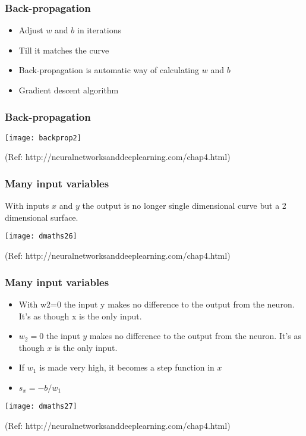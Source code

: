 \begin{frame}[fragile] \frametitle{Back-propagation}
\begin{itemize}
\item Adjust $w$ and $b$ in iterations
\item Till it matches the curve
\item Back-propagation is automatic way of calculating $w$ and $b$
\item Gradient descent algorithm
\end{itemize}
\end{frame}

\begin{frame}[fragile] \frametitle{Back-propagation}
\begin{center}
\texttt{[image: backprop2]}
\end{center}
{\tiny (Ref: http://neuralnetworksanddeeplearning.com/chap4.html)}
\end{frame}



\begin{frame}[fragile] \frametitle{Many input variables}
With inputs $x$ and $y$ the output is no longer single dimensional curve but a 2 dimensional surface.

\begin{center}
\texttt{[image: dmaths26]}
\end{center}
{\tiny (Ref: http://neuralnetworksanddeeplearning.com/chap4.html)}

\end{frame}

\begin{frame}[fragile] \frametitle{Many input variables}

\begin{itemize}
\item With w2=0 the input y makes no difference to the output from the neuron. It's as though x is the only input.
\item $w_2=0$ the input $y$ makes no difference to the output from the neuron. It's as though $x$ is the only input.
\item If $w_1$ is made very high, it becomes a step function in $x$
\item $s_x = -b/w_1$
\end{itemize}

\begin{center}
\texttt{[image: dmaths27]}
\end{center}
{\tiny (Ref: http://neuralnetworksanddeeplearning.com/chap4.html)}
\end{frame}

